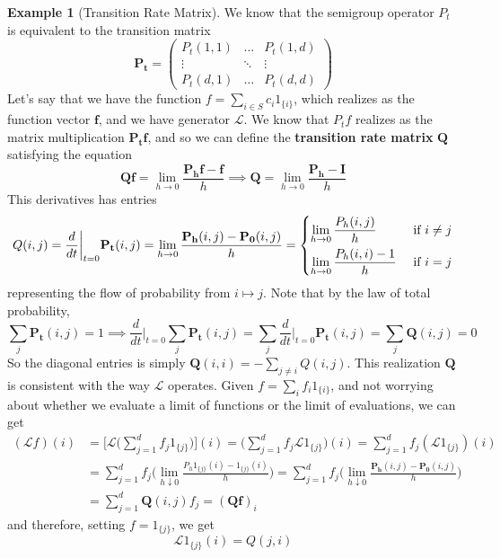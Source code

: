 \documentclass{article}
\theoremstyle{definition}
\newtheorem{example}{Example}[section]
\theoremstyle{remark}
\theoremstyle{definition}
\begin{document}
\begin{example}[Transition Rate Matrix]
We know that the semigroup operator $P_t$ is equivalent to the transition matrix 
\[\mathbf{P_t} = \begin{pmatrix} P_t (1, 1) & \ldots & P_t (1, d) \\ \vdots & \ddots & \vdots \\ P_t (d, 1) & \ldots & P_t (d, d) \end{pmatrix}\]
Let's say that we have the function $f = \sum_{i \in S} c_i 1_{\{i\}}$, which realizes as the function vector $\mathbf{f}$, and we have generator $\mathscr{L}$. We know that $P_t f$ realizes as the matrix multiplication $\mathbf{P_t} \mathbf{f}$, and so we can define the \textbf{transition rate matrix} $\mathbf{Q}$ satisfying the equation 
\[\mathbf{Q} \mathbf{f}= \lim_{h \rightarrow 0} \frac{\mathbf{P_h} \mathbf{f} - \mathbf{f}}{h} \implies \mathbf{Q} = \lim_{h \rightarrow 0} \frac{\mathbf{P_h} - \mathbf{I}}{h}\]
This derivatives has entries 
\[Q(i, j) = \frac{d}{dt} \bigg|_{t = 0} \mathbf{P_t} (i, j) = \lim_{h \rightarrow 0} \frac{\mathbf{P_h} (i, j) - \mathbf{P_0} (i, j)}{h} = \begin{dcases} \lim_{h \rightarrow 0} \frac{P_h (i, j)}{h} & \text{ if } i \neq j \\ \lim_{h \rightarrow 0} \frac{P_h (i, i) - 1}{h} & \text{ if } i = j \end{dcases}\]
representing the flow of probability from $i \mapsto j$. Note that by the law of total probability, 
\[\sum_j \mathbf{P_t} (i, j) = 1 \implies \frac{d}{dt} \bigg|_{t = 0} \sum_{j} \mathbf{P_t} (i, j) =  \sum_j \frac{d}{dt} \bigg|_{t = 0} \mathbf{P_t} (i, j) = \sum_{j} \mathbf{Q} (i, j) = 0\]
So the diagonal entries is simply $\mathbf{Q}(i, i) = - \sum_{j \neq i} Q(i, j)$. This realization $\mathbf{Q}$ is consistent with the way $\mathscr{L}$ operates. Given $f = \sum_i f_i 1_{\{i\}}$, and not worrying about whether we evaluate a limit of functions or the limit of evaluations, we can get 
\begin{align*}
    (\mathscr{L} f) (i) & = \bigg[ \mathscr{L} \bigg( \sum_{j=1}^d f_j 1_{\{j\}} \bigg) \bigg] (i) = \bigg( \sum_{j=1}^d f_j \mathscr{L} 1_{\{j\}} \bigg) (i) = \sum_{j=1}^d f_j ( \mathscr{L} 1_{\{j\}}) (i) \\ 
    & = \sum_{j=1}^d f_j \bigg( \lim_{h \downarrow 0} \frac{P_h 1_{\{ j\}} (i) - 1_{\{j\}} (i)}{h} \bigg) = \sum_{j=1}^d f_j \bigg( \lim_{h \downarrow 0} \frac{\mathbf{P_h} (i, j) - \mathbf{P_0} (i, j)}{h} \bigg) \\
    & = \sum_{j=1}^d \mathbf{Q}(i, j) f_j = (\mathbf{Q} \mathbf{f})_i 
\end{align*}
and therefore, setting $f = 1_{\{j\}}$, we get 
\[\mathscr{L} 1_{\{j\}} (i) = Q(j, i)\]
\end{example}
\end{document}
